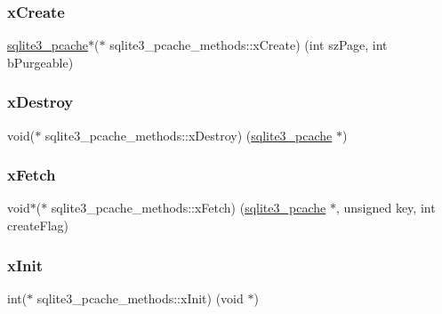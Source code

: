 \subsubsection{\texorpdfstring{xCreate}{xCreate}}
{\footnotesize\ttfamily \mbox{\hyperlink{sqlite3_8h_a096c453d937d51f7926d7d31c8e0bd2f}{sqlite3\+\_\+pcache}}$\ast$($\ast$ sqlite3\+\_\+pcache\+\_\+methods\+::x\+Create) (int sz\+Page, int b\+Purgeable)}

\mbox{\label{structsqlite3__pcache__methods_ac775533f86db1d15bf7e4ded0e037eaf}} 
\subsubsection{\texorpdfstring{xDestroy}{xDestroy}}
{\footnotesize\ttfamily void($\ast$ sqlite3\+\_\+pcache\+\_\+methods\+::x\+Destroy) (\mbox{\hyperlink{sqlite3_8h_a096c453d937d51f7926d7d31c8e0bd2f}{sqlite3\+\_\+pcache}} $\ast$)}

\mbox{\label{structsqlite3__pcache__methods_ae09b8ed29c2dd77157f26a69255fd482}} 
\subsubsection{\texorpdfstring{xFetch}{xFetch}}
{\footnotesize\ttfamily void$\ast$($\ast$ sqlite3\+\_\+pcache\+\_\+methods\+::x\+Fetch) (\mbox{\hyperlink{sqlite3_8h_a096c453d937d51f7926d7d31c8e0bd2f}{sqlite3\+\_\+pcache}} $\ast$, unsigned key, int create\+Flag)}

\mbox{\label{structsqlite3__pcache__methods_ac75d3dbf840e6f05ea08d35ad0457fb2}} 
\subsubsection{\texorpdfstring{xInit}{xInit}}
{\footnotesize\ttfamily int($\ast$ sqlite3\+\_\+pcache\+\_\+methods\+::x\+Init) (void $\ast$)}

